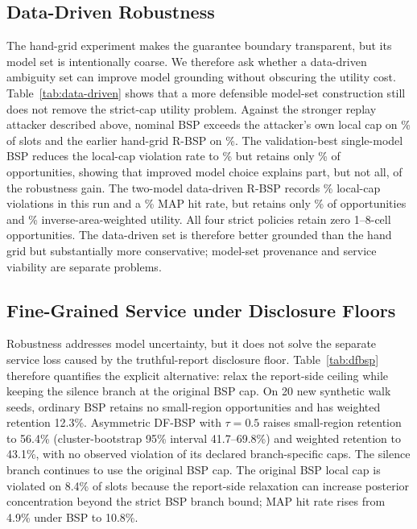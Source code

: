 \documentclass[10pt,journal,compsoc]{IEEEtran}
\begin{document}
\subsection{Data-Driven Robustness}
\label{sec:data-driven-results}
The hand-grid experiment makes the guarantee boundary transparent, but its model set is intentionally coarse. We therefore ask whether a data-driven ambiguity set can improve model grounding without obscuring the utility cost. Table~\ref{tab:data-driven} shows that a more defensible model-set construction still does not remove the strict-cap utility problem. Against the stronger replay attacker described above, nominal BSP exceeds the attacker's own local cap on \GeoNominalLocal\% of slots and the earlier hand-grid R-BSP on \GeoHandLocal\%. The validation-best single-model BSP reduces the local-cap violation rate to \GeoSingleLocal\% but retains only \GeoSingleRet\% of opportunities, showing that improved model choice explains part, but not all, of the robustness gain. The two-model data-driven R-BSP records \GeoStrictLocal\% local-cap violations in this run and a \GeoStrictHit\% MAP hit rate, but retains only \GeoStrictRet\% of opportunities and \GeoStrictWeighted\% inverse-area-weighted utility. All four strict policies retain zero 1--8-cell opportunities. The data-driven set is therefore better grounded than the hand grid but substantially more conservative; model-set provenance and service viability are separate problems.

\begin{table}[t]
\centering
\caption{GeoLife data-driven robustness at $\rho=0.1$. The attacker uses the development-derived population prior and validation mobility estimate. ``Local viol.'' is the pre-output local-cap violation rate; small retention covers 1--8-cell opportunities.}
\label{tab:data-driven}{\scriptsize\setlength{\tabcolsep}{3pt}}
\end{table}

\subsection{Fine-Grained Service under Disclosure Floors}
Robustness addresses model uncertainty, but it does not solve the separate service loss caused by the truthful-report disclosure floor. Table~\ref{tab:dfbsp} therefore quantifies the explicit alternative: relax the report-side ceiling while keeping the silence branch at the original BSP cap. On 20 new synthetic walk seeds, ordinary BSP retains no small-region opportunities and has weighted retention 12.3\%. Asymmetric DF-BSP with $\tau=0.5$ raises small-region retention to 56.4\% (cluster-bootstrap 95\% interval 41.7--69.8\%) and weighted retention to 43.1\%, with no observed violation of its declared branch-specific caps. The silence branch continues to use the original BSP cap. The original BSP local cap is violated on 8.4\% of slots because the report-side relaxation can increase posterior concentration beyond the strict BSP branch bound; MAP hit rate rises from 4.9\% under BSP to 10.8\%.
\end{document}
